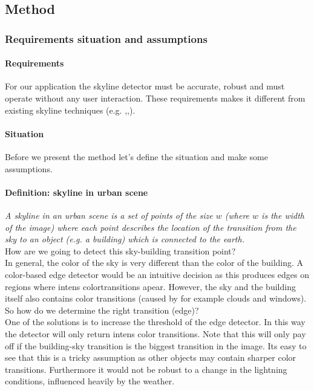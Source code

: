 \subsection{Method} %
\subsubsection{Requirements situation and assumptions}
\paragraph{Requirements}
For our application the skyline detector must be accurate, robust and must
operate without any user interaction. These requirements makes it different from
existing skyline techniques (e.g.
\cite{Dust},\cite{Guidedflight},\cite{Rover}).\\

\paragraph{Situation}
Before we present the method let's define the situation and make some
assumptions.\\

\paragraph{Definition: skyline in urban scene}
\emph{A skyline in an urban scene is a set of points of the size $w$ (where $w$ is the
width of the image) where each point describes the location of the
transition from the sky to an object (e.g. a building) which is connected to the
earth.}\\

How are we going to detect this sky-building transition point?\\ 
In general, the color of the sky is very different than the color of the
building.  A color-based edge detector would be an intuitive decision as this
produces edges on regions where intens  colortransitions apear.  However, the
sky and the building itself also contains color transitions (caused by for
example clouds and windows). So how do we determine the right transition
(edge)?\\

One of the solutions is to increase the threshold of the edge detector. In this
way the detector will only return intens color transitions. Note that this will
only pay off if the building-sky transition is the biggest transition in the image. 
Its easy to see that this is a tricky assumption as other objects may contain
sharper color transitions. Furthermore it would not be robust to a change in
the lightning conditions, influenced heavily by the weather.\\

